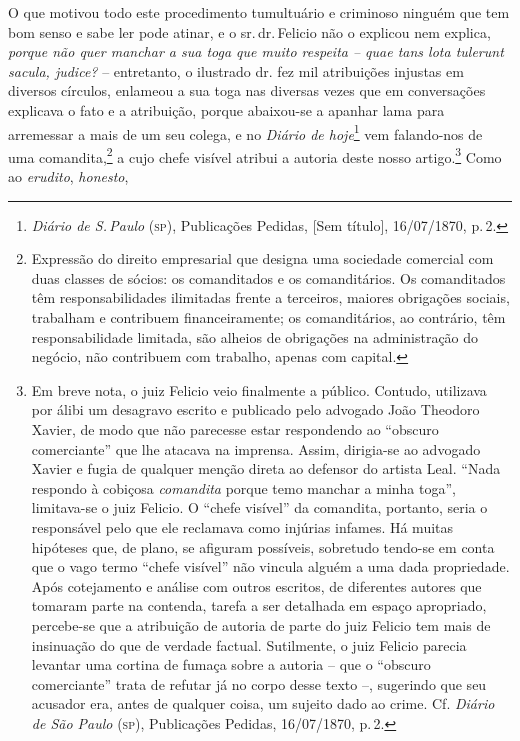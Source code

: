 O que motivou todo este procedimento tumultuário e criminoso ninguém que
tem bom senso e sabe ler pode atinar, e o sr.\,dr.\,Felicio não o explicou
nem explica, \emph{porque não quer manchar a sua toga que muito respeita
-- quae tans lota tulerunt sacula, judice?} -- entretanto, o ilustrado
dr. fez mil atribuições injustas em diversos círculos, enlameou a sua
toga nas diversas vezes que em conversações explicava o fato e a
atribuição, porque abaixou-se a apanhar lama para arremessar a mais de
um seu colega, e no \emph{Diário de hoje}\footnote{ \emph{Diário de S.\,Paulo} (\textsc{sp}), Publicações Pedidas, {[}Sem título{]}, 16/07/1870, p.\,2.}
vem falando-nos de uma comandita,\footnote{ Expressão do direito
  empresarial que designa uma sociedade comercial com duas classes de
  sócios: os comanditados e os comanditários. Os comanditados têm
  responsabilidades ilimitadas frente a terceiros, maiores obrigações
  sociais, trabalham e contribuem financeiramente; os comanditários, ao
  contrário, têm responsabilidade limitada, são alheios de obrigações na
  administração do negócio, não contribuem com trabalho, apenas com
  capital.} a cujo chefe visível atribui a autoria deste nosso
artigo.\footnote{ Em breve nota, o juiz Felicio veio finalmente a
  público. Contudo, utilizava por álibi um desagravo escrito e publicado
  pelo advogado João Theodoro Xavier, de modo que não parecesse estar
  respondendo ao ``obscuro comerciante'' que lhe atacava na imprensa.
  Assim, dirigia-se ao advogado Xavier e fugia de qualquer menção direta
  ao defensor do artista Leal. ``Nada respondo à cobiçosa
  \emph{comandita} porque temo manchar a minha toga'', limitava-se o juiz
  Felicio. O ``chefe visível'' da comandita, portanto, seria o responsável
  pelo que ele reclamava como injúrias infames. Há muitas hipóteses que,
  de plano, se afiguram possíveis, sobretudo tendo-se em conta que o
  vago termo ``chefe visível'' não vincula alguém a uma dada propriedade.
  Após cotejamento e análise com outros escritos, de diferentes autores
  que tomaram parte na contenda, tarefa a ser detalhada em espaço
  apropriado, percebe-se que a atribuição de autoria de parte do juiz
  Felicio tem mais de insinuação do que de verdade factual. Sutilmente,
  o juiz Felicio parecia levantar uma cortina de fumaça sobre a autoria
  -- que o ``obscuro comerciante'' trata de refutar já no corpo desse
  texto --, sugerindo que seu acusador era, antes de qualquer coisa, um
  sujeito dado ao crime. Cf. \emph{Diário de São Paulo} (\textsc{sp}), Publicações
  Pedidas, 16/07/1870, p.\,2.} Como ao \emph{erudito}, \emph{honesto},

